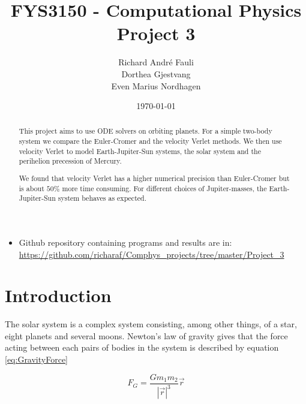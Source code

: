 \documentclass[norsk,a4paper,12pt]{article}
\title{FYS3150 - Computational Physics\\\vspace{2mm} \Large{Project 3}}
\author{\large Richard Andr\'e Fauli\\ Dorthea Gjestvang\\ Even Marius Nordhagen}
\date{\today}
\begin{document}
\maketitle

\begin{abstract}
This project aims to use ODE solvers on orbiting planets. For a simple two-body system we compare the Euler-Cromer and the velocity Verlet methods. We then use velocity Verlet to model Earth-Jupiter-Sun systems, the solar system and the perihelion precession of Mercury.

We found that velocity Verlet has a higher numerical precision than Euler-Cromer but is about $50\%$ more time consuming. For different choices of Jupiter-masses, the Earth-Jupiter-Sun system behaves as expected.
\end{abstract}
\begin{itemize}
\item Github repository containing programs and results are in: \url{https://github.com/richaraf/Comphys_projects/tree/master/Project_3}
\end{itemize}
\section{Introduction}
The solar system is a complex system consisting, among other things, of a star, eight planets and several moons. Newton's law of gravity gives that the force acting between each pairs of bodies in the system is described by equation \ref{eq:GravityForce}

\begin{equation}
    F_G = \frac{G m_1 m_2}{|\vec{r}|^3}\vec{r}
    \label{eq:GravityForce}
\end{equation}
\end{document}
